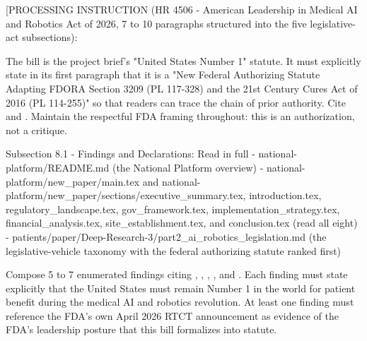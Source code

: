 
[PROCESSING INSTRUCTION (HR 4506 - American Leadership in Medical AI
and Robotics Act of 2026, 7 to 10 paragraphs structured into the five
legislative-act subsections):

The bill is the project brief's "United States Number 1" statute. It
must explicitly state in its first paragraph that it is a "New Federal
Authorizing Statute Adapting FDORA Section 3209 (PL 117-328) and the
21st Century Cures Act of 2016 (PL 114-255)" so that readers can trace
the chain of prior authority. Cite
\cite{rank4_fdora_fda_modernization_2022} and
\cite{rank1_cures_act_2016}. Maintain the respectful FDA framing
throughout: this is an authorization, not a critique.

Subsection 8.1 - Findings and Declarations: Read in full
- national-platform/README.md (the National Platform overview)
- national-platform/new\_paper/main.tex and
  national-platform/new\_paper/sections/executive\_summary.tex,
  introduction.tex, regulatory\_landscape.tex, gov\_framework.tex,
  implementation\_strategy.tex, financial\_analysis.tex,
  site\_establishment.tex, and conclusion.tex (read all eight)
- patients/paper/Deep-Research-3/part2\_ai\_robotics\_legislation.md (the
  legislative-vehicle taxonomy with the federal authorizing statute
  ranked first)

Compose 5 to 7 enumerated findings citing
\cite{kawchak_2026_19244918}, \cite{main_repo},
\cite{rank4_fdora_fda_modernization_2022}, \cite{fda_rtct_press_2026},
and \cite{fda_oce_advancing_oncology_dct_2024}. Each finding must
state explicitly that the United States must remain Number 1 in the
world for patient benefit during the medical AI and robotics
revolution. At least one finding must reference the FDA's own April
2026 RTCT announcement as evidence of the FDA's leadership posture
that this bill formalizes into statute.

